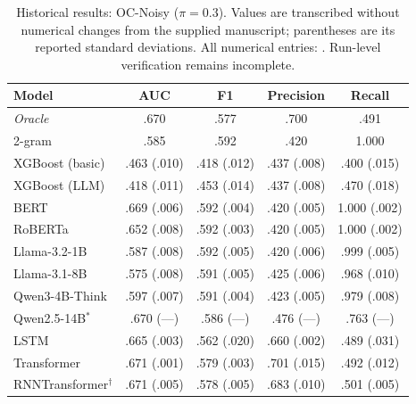 \begin{table}[H]
\centering\small
\caption{Historical results: OC-Noisy ($\pi=0.3$). Values are transcribed without numerical changes from the supplied manuscript; parentheses are its reported standard deviations. All numerical entries: \ou. Run-level verification remains incomplete.}
\begin{tabular}{@{}lcccc@{}}\toprule
Model & AUC & F1 & Precision & Recall \\\midrule
\textit{Oracle} & .670 & .577 & .700 & .491 \\
2-gram & .585 & .592 & .420 & 1.000 \\
XGBoost (basic) & .463 (.010) & .418 (.012) & .437 (.008) & .400 (.015) \\
XGBoost (LLM) & .418 (.011) & .453 (.014) & .437 (.008) & .470 (.018) \\
BERT & .669 (.006) & .592 (.004) & .420 (.005) & 1.000 (.002) \\
RoBERTa & .652 (.008) & .592 (.003) & .420 (.005) & 1.000 (.002) \\
Llama-3.2-1B & .587 (.008) & .592 (.005) & .420 (.006) & .999 (.005) \\
Llama-3.1-8B & .575 (.008) & .591 (.005) & .425 (.006) & .968 (.010) \\
Qwen3-4B-Think & .597 (.007) & .591 (.004) & .423 (.005) & .979 (.008) \\
Qwen2.5-14B$^{*}$ & .670 (---) & .586 (---) & .476 (---) & .763 (---) \\
LSTM & .665 (.003) & .562 (.020) & .660 (.002) & .489 (.031) \\
Transformer & .671 (.001) & .579 (.003) & .701 (.015) & .492 (.012) \\
RNNTransformer$^{\dagger}$ & .671 (.005) & .578 (.005) & .683 (.010) & .501 (.005) \\
\bottomrule\end{tabular}
\end{table}
